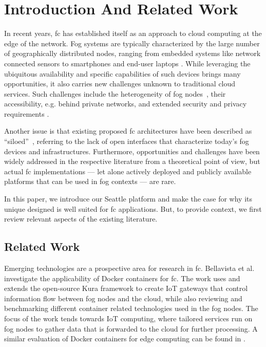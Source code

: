 \section{Introduction And Related Work}

In recent years, \gls{fc} has established itself as an approach to
cloud computing at the edge of the network. Fog systems are typically
characterized by the large number of geographically distributed
nodes, ranging
from embedded systems like network connected
sensors to smartphones and end-user laptops
\cite{Bonomi:2012:FCR:2342509.2342513,Yi:2015:SFC:2757384.2757397,dastjerdi_fog_2016}.
While leveraging the
ubiquitous availability and specific capabilities of such devices brings
many opportunities, it also carries new challenges unknown to traditional cloud
services. Such challenges include the heterogeneity of fog
nodes~\cite{Bonomi:2012:FCR:2342509.2342513,7868354,Yi:2015:SFC:2757384.2757397,mahmud_fog_2016},
their accessibility, e.g. behind private networks, and extended security and
privacy requirements \cite{botta_integration_2016}.

Another issue is that existing proposed \gls{fc} architectures have
been described
as ``siloed''~\cite{belli_design_2015}, referring to the lack of
open interfaces that characterize today's fog devices and infrastructures.
Furthermore, opportunities and challenges have been widely addressed in the
respective literature from a theoretical point of view, but actual \gls{fc}
implementations --- let alone actively deployed and
publicly available platforms that can be used in fog contexts --- are rare.

In this paper, we introduce our Seattle platform and make the case for
why its unique designed is well suited for \gls{fc} applications. But,
to provide context, we first review relevant aspects of the existing
literature.

\subsection{Related Work}

Emerging technologies are a prospective area for research in \gls{fc}.
Bellavista et al.~\cite{bellavista_feasibility_2017} investigate the
applicability of Docker containers for \gls{fc}. The work uses and extends
the open-source Kura framework to create \gls{IoT} gateways that control information
flow between fog nodes and the cloud, while also reviewing and benchmarking
different container related technologies used in the fog nodes.
The focus of the work tends towards \gls{IoT} computing, where tailored services run
on fog nodes to gather data that is forwarded to the cloud for further processing.
A similar evaluation of Docker containers for edge computing can be found in
\cite{ismail_evaluation_2015}.

